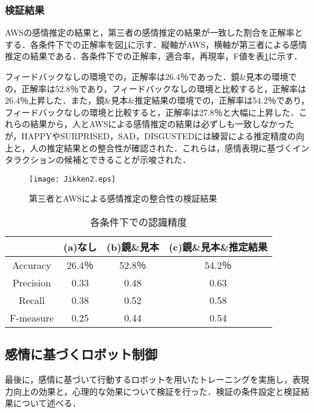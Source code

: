 \documentclass[titlepage]{jarticle}
\begin{document}
\subsubsection{検証結果}
AWSの感情推定の結果と，第三者の感情推定の結果が一致した割合を正解率とする．各条件下での正解率を図\ref{Jikken2}に示す．縦軸がAWS，横軸が第三者による感情推定の結果である．各条件下での正解率，適合率，再現率，F値を表\ref{Jikken2_accuracy}に示す．

フィードバックなしの環境での，正解率は26.4$％$であった．鏡\&見本の環境での，正解率は52.8$％$であり，フィードバックなしの環境と比較すると，正解率は26.4$％$上昇した．また，鏡\&見本\&推定結果の環境での，正解率は54.2$％$であり，フィードバックなしの環境と比較すると，正解率は27.8$％$と大幅に上昇した．これらの結果から，人とAWSによる感情推定の結果は必ずしも一致しなかったが，HAPPYやSURPRISED，SAD，DISGUSTEDには練習による推定精度の向上と，人の推定結果との整合性が確認された．これらは，感情表現に基づくインタラクションの候補とできることが示唆された．

\begin{figure}[h]
\begin{center}
\texttt{[image: Jikken2.eps]}
\end{center}
\caption{第三者とAWSによる感情推定の整合性の検証結果}
\label{Jikken2} %
\end{figure}

\begin{table}[h]
\centering
\caption{各条件下での認識精度}
\begin{tabular}{|c||c|c|c|}
	\hline
         & (a)なし & (b)鏡\&見本 & (c)鏡\&見本\&推定結果\\
    \hline
    \hline
		Accuracy & 26.4$％$ & 52.8$％$ & 54.2$％$\\
	\hline
		Precision & 0.33 & 0.48 & 0.63\\
	\hline
		Recall & 0.38 & 0.52 & 0.58 \\
	\hline
		F-measure & 0.25 & 0.44 & 0.54\\
	\hline
\end{tabular}
\label{Jikken2_accuracy}
\end{table}


\afterpage{\clearpage}
\newpage

\subsection{感情に基づくロボット制御}
最後に，感情に基づいて行動するロボットを用いたトレーニングを実施し，表現力向上の効果と，心理的な効果について検証を行った．検証の条件設定と検証結果について述べる．
\end{document}
